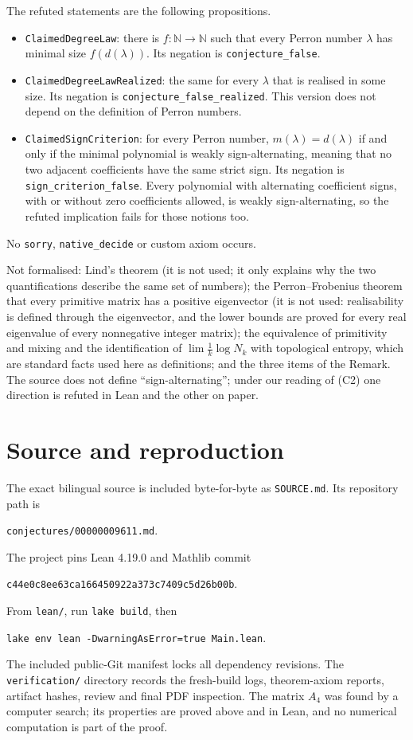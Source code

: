 \documentclass[11pt]{article}
\theoremstyle{remark}
\begin{document}
The refuted statements are the following propositions.
\begin{itemize}
\item \texttt{ClaimedDegreeLaw}: there is $f:\mathbb{N}\to\mathbb{N}$
such that every Perron number $\lambda$ has minimal size
$f(d(\lambda))$. Its negation is \texttt{conjecture\_false}.
\item \texttt{ClaimedDegreeLawRealized}: the same for every $\lambda$
that is realised in some size. Its negation is
\texttt{conjecture\_false\_realized}. This version does not depend on
the definition of Perron numbers.
\item \texttt{ClaimedSignCriterion}: for every Perron number,
$m(\lambda)=d(\lambda)$ if and only if the minimal polynomial is weakly
sign-alternating, meaning that no two adjacent coefficients have the
same strict sign. Its negation is \texttt{sign\_criterion\_false}.
Every polynomial with alternating coefficient signs, with or without
zero coefficients allowed, is weakly sign-alternating, so the refuted
implication fails for those notions too.
\end{itemize}
No \texttt{sorry}, \texttt{native\_decide} or custom axiom occurs.

Not formalised: Lind's theorem (it is not used; it only explains why
the two quantifications describe the same set of numbers); the
Perron--Frobenius theorem that every primitive matrix has a positive
eigenvector (it is not used: realisability is defined through the
eigenvector, and the lower bounds are proved for every real eigenvalue
of every nonnegative integer matrix); the equivalence of primitivity
and mixing and the identification of $\lim\frac1k\log N_k$ with
topological entropy, which are standard facts used here as definitions;
and the three items of the Remark. The source does not define
``sign-alternating''; under our reading of (C2) one direction is
refuted in Lean and the other on paper.

\section*{Source and reproduction}
The exact bilingual source is included byte-for-byte as
\texttt{SOURCE.md}. Its repository path is
\begin{center}\small\texttt{conjectures/00000009611.md}.\end{center}
The project pins Lean 4.19.0 and Mathlib commit
\begin{center}\small\texttt{c44e0c8ee63ca166450922a373c7409c5d26b00b}.\end{center}
From \texttt{lean/}, run \texttt{lake build}, then
\begin{center}\small\texttt{lake env lean -DwarningAsError=true Main.lean}.\end{center}
The included public-Git manifest locks all dependency revisions. The
\texttt{verification/} directory records the fresh-build logs,
theorem-axiom reports, artifact hashes, review and final PDF
inspection. The matrix $A_4$ was found by a computer search; its
properties are proved above and in Lean, and no numerical computation
is part of the proof.
\end{document}
